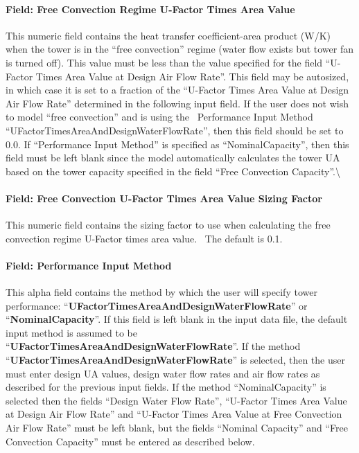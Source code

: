 \paragraph{Field: Free Convection Regime U-Factor Times Area Value}\label{fieldfree-convection-regine-u-factor-times-area-value}

This numeric field contains the heat transfer coefficient-area product (W/K) when the tower is in the ``free convection'' regime (water flow exists but tower fan is turned off). This value must be less than the value specified for the field ``U-Factor Times Area Value at Design Air Flow Rate''. This field may be autosized, in which case it is set to a fraction of the ``U-Factor Times Area Value at Design Air Flow Rate'' determined in the following input field. If the user does not wish to model ``free convection'' and is using the~ Performance Input Method ``UFactorTimesAreaAndDesignWaterFlowRate'', then this field should be set to 0.0. If ``Performance Input Method'' is specified as ``NominalCapacity'', then this field must be left blank since the model automatically calculates the tower UA based on the tower capacity specified in the field ``Free Convection Capacity''.\textbackslash{}

\paragraph{Field: Free Convection U-Factor Times Area Value Sizing Factor}\label{field-free-convection-u-factor-times-area-value-sizing-factor}

This numeric field contains the sizing factor to use when calculating the free convection regime U-Factor times area value.~ The default is 0.1.

\paragraph{Field: Performance Input Method}\label{field-performance-input-method}

This alpha field contains the method by which the user will specify tower performance: ``\textbf{UFactorTimesAreaAndDesignWaterFlowRate}'' or ``\textbf{NominalCapacity}''. If this field is left blank in the input data file, the default input method is assumed to be ``\textbf{UFactorTimesAreaAndDesignWaterFlowRate}''. If the method ``\textbf{UFactorTimesAreaAndDesignWaterFlowRate}'' is selected, then the user must enter design UA values, design water flow rates and air flow rates as described for the previous input fields. If the method ``NominalCapacity'' is selected then the fields ``Design Water Flow Rate'', ``U-Factor Times Area Value at Design Air Flow Rate'' and ``U-Factor Times Area Value at Free Convection Air Flow Rate'' must be left blank, but the fields ``Nominal Capacity'' and ``Free Convection Capacity'' must be entered as described below.

